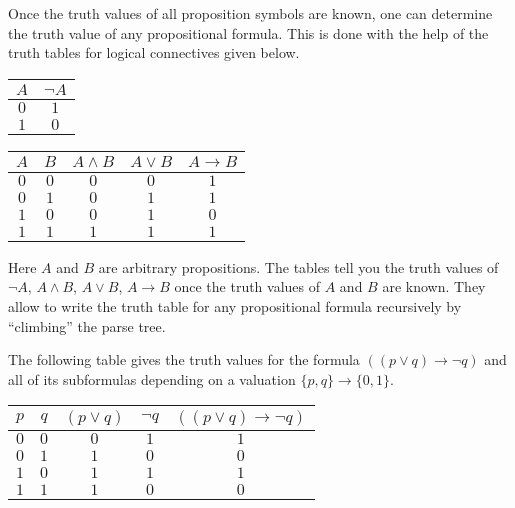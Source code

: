 \begin{page}
\setcounter{section}{1}
\setcounter{subsection}{2}
\setcounter{dfn}{2}
\label{portion:356}


Once the truth values of all proposition symbols are known, one can determine the truth value of any propositional formula.
This is done with the help of the truth tables for logical connectives given below.

\begin{center}
\begin{tabular}{|c||c|}
\hline
$A$ & $\neg A$\\\hline
$0$ & $1$\\\hline
$1$ & $0$\\\hline
\end{tabular}
\hspace{2cm}
\begin{tabular}{|c|c||c|c|c|}
\hline
$A$ & $B$ & $A \wedge B$ & $A \vee B$ & $A \to B$\\\hline
$0$ & $0$ & $0$ & $0$ & $1$\\\hline
$0$ & $1$ & $0$ & $1$ & $1$\\\hline
$1$ & $0$ & $0$ & $1$ & $0$\\\hline
$1$ & $1$ & $1$ & $1$ & $1$\\\hline
\end{tabular}
\end{center}

Here $A$ and $B$ are arbitrary propositions.
The tables tell you the truth values of $\neg A$, $A \wedge B$, $A \vee B$, $A \to B$ once the truth values of $A$ and $B$ are known.
They allow to write the truth table for any propositional formula recursively by ``climbing'' the parse tree.


\end{page}

\begin{page}
\setcounter{section}{1}
\setcounter{subsection}{2}
\setcounter{dfn}{3}
\label{portion:358}

\begin{exl}
\label{exl:TruthTable}
The following table gives the truth values for the formula $((p \vee q) \to \neg q)$ and all of its subformulas
depending on a valuation $\{p, q\} \to \{0,1\}$.
\begin{center}
\begin{tabular}{|c|c|c|c|c|}
\hline
$p$ & $q$ & $(p \vee q)$ & $\neg q$ & $((p \vee q) \to \neg q)$\\\hline
$0$ & $0$ & $0$ & $1$ & $1$\\\hline
$0$ & $1$ & $1$ & $0$ & $0$\\\hline
$1$ & $0$ & $1$ & $1$ & $1$\\\hline
$1$ & $1$ & $1$ & $0$ & $0$\\\hline
\end{tabular}
\end{center}
\end{exl}

\end{page}

